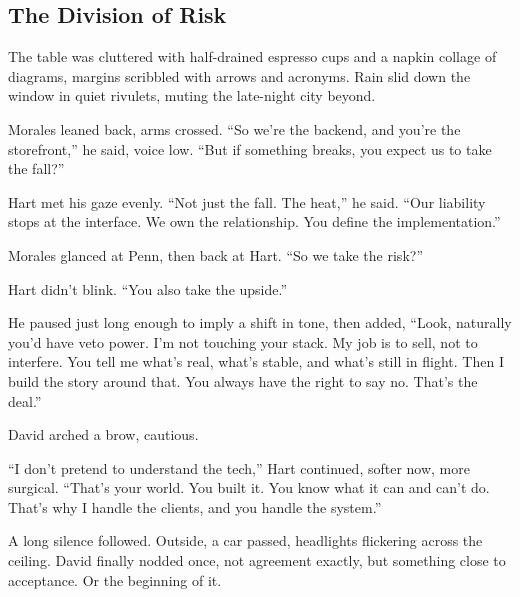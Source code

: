 \medskip

\subsection{The Division of Risk}

The table was cluttered with half-drained espresso cups and a napkin collage of diagrams, margins scribbled with 
arrows and acronyms. Rain slid down the window in quiet rivulets, muting the late-night city beyond.

Morales leaned back, arms crossed. ``So we’re the backend, and you’re the storefront,'' he said, voice low. ``But 
if something breaks, you expect us to take the fall?''

Hart met his gaze evenly. ``Not just the fall. The heat,'' he said. ``Our liability stops at the interface. We own 
the relationship. You define the implementation.''

Morales glanced at Penn, then back at Hart. ``So we take the risk?''

Hart didn’t blink. ``You also take the upside.''

He paused just long enough to imply a shift in tone, then added, ``Look, naturally you'd have veto power. 
I’m not touching your stack. My job is to sell, not to interfere. You tell me what’s real, what’s stable, 
and what’s still in flight. Then I build the story around that. You always have the right to say no. 
That’s the deal.''

David arched a brow, cautious.

``I don’t pretend to understand the tech,'' Hart continued, softer now, more surgical. ``That’s your world. You built it. 
You know what it can and can’t do. That’s why I handle the clients, and you handle the system.''

A long silence followed. Outside, a car passed, headlights flickering across the ceiling. David finally nodded once, 
not agreement exactly, but something close to acceptance. Or the beginning of it.

\medskip

